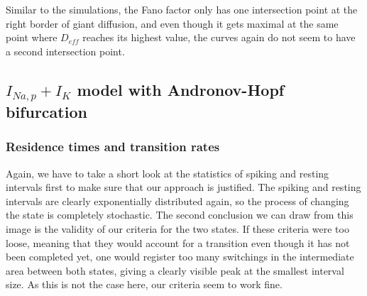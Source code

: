 \documentclass[12pt,a4paper]{article}
\begin{document}
Similar to the simulations, the Fano factor only has one intersection point at the right border of giant diffusion, and even though it gets maximal at the same point where $D_{eff}$ reaches its highest value, the curves again do not seem to have a second intersection point.
\subsection{$I_{Na,p}+I_K$ model with Andronov-Hopf bifurcation}
\subsubsection{Residence times and transition rates}
Again, we have to take a short look at the statistics of spiking and resting intervals first to make sure that our approach is justified. The spiking and resting intervals are clearly exponentially distributed again, so the process of changing the state is completely stochastic. The second conclusion we can draw from this image is the validity of our criteria for the two states. If these criteria were too loose, meaning that they would account for a transition even though it has not been completed yet, one would register too many switchings in the intermediate area between both states, giving a clearly visible peak at the smallest interval size. As this is not the case here, our criteria seem to work fine.
\end{document}
